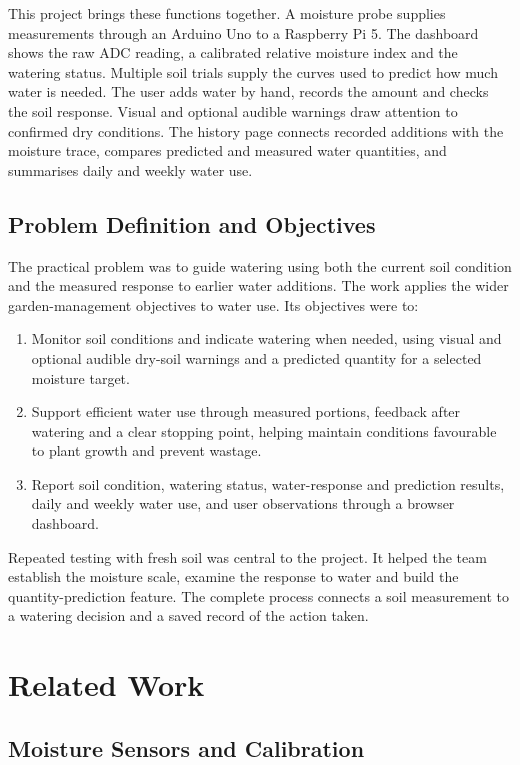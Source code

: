 \documentclass[11pt,a4paper]{article}
\begin{document}
This project brings these functions together. A moisture probe supplies measurements through an Arduino Uno to a Raspberry Pi 5. The dashboard shows the raw ADC reading, a calibrated relative moisture index and the watering status. Multiple soil trials supply the curves used to predict how much water is needed. The user adds water by hand, records the amount and checks the soil response. Visual and optional audible warnings draw attention to confirmed dry conditions. The history page connects recorded additions with the moisture trace, compares predicted and measured water quantities, and summarises daily and weekly water use.

\subsection{Problem Definition and Objectives}

The practical problem was to guide watering using both the current soil condition and the measured response to earlier water additions. The work applies the wider garden-management objectives to water use. Its objectives were to:

\begin{enumerate}
\item Monitor soil conditions and indicate watering when needed, using visual and optional audible dry-soil warnings and a predicted quantity for a selected moisture target.
\item Support efficient water use through measured portions, feedback after watering and a clear stopping point, helping maintain conditions favourable to plant growth and prevent wastage.
\item Report soil condition, watering status, water-response and prediction results, daily and weekly water use, and user observations through a browser dashboard.
\end{enumerate}

Repeated testing with fresh soil was central to the project. It helped the team establish the moisture scale, examine the response to water and build the quantity-prediction feature. The complete process connects a soil measurement to a watering decision and a saved record of the action taken.

\section{Related Work}

\subsection{Moisture Sensors and Calibration}
\end{document}
